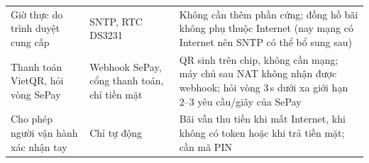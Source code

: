 \begin{longtable}{@{}p{3.3cm}p{3.6cm}p{7.4cm}@{}}
Giờ thực do trình duyệt cung cấp & SNTP, RTC DS3231 & Không cần thêm phần cứng; đồng hồ bãi không phụ thuộc Internet (nay mạng có Internet nên SNTP có thể bổ sung sau) \\
Thanh toán VietQR, hỏi vòng SePay & Webhook SePay, cổng thanh toán, chỉ tiền mặt & QR sinh trên chip, không cần mạng; máy chủ sau NAT không nhận được webhook; hỏi vòng 3\,s dưới xa giới hạn 2–3 yêu cầu/giây của SePay \\
Cho phép người vận hành xác nhận tay & Chỉ tự động & Bãi vẫn thu tiền khi mất Internet, khi không có token hoặc khi trả tiền mặt; cần mã PIN \\
\bottomrule
\end{longtable}


